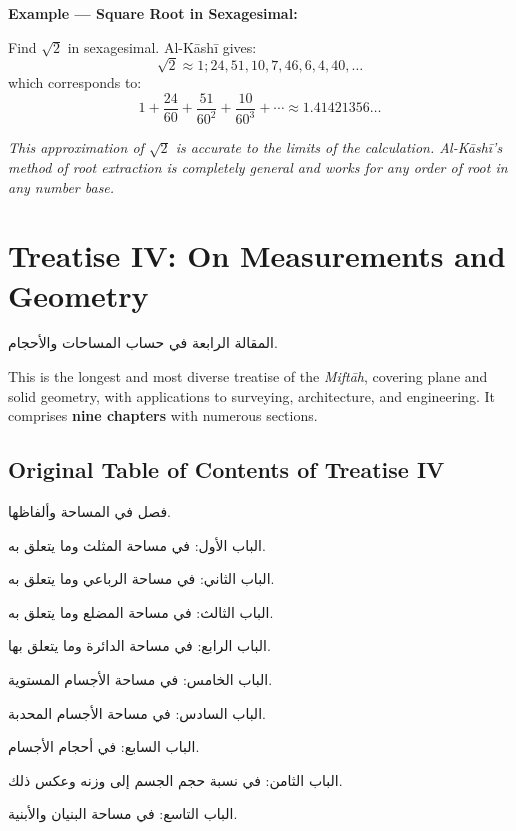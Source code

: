\documentclass[11pt,a4paper]{article}
\newenvironment{arabicbox}{%
  \begin{framed}
  \begin{minipage}{\linewidth-2\fboxsep-2\fboxrule}
  \setlength{\parindent}{0pt}
  \linespread{1.3}\selectfont
}{%
  \end{minipage}
  \end{framed}
}
\newcommand{\cnote}[1]{\textcolor{notecolor}{\textit{#1}}}
\begin{document}
\noindent\textbf{Example --- Square Root in Sexagesimal:}

Find $\sqrt{2}$ in sexagesimal. Al-K\=ash\=i gives:
\[
\sqrt{2} \approx 1; 24, 51, 10, 7, 46, 6, 4, 40, \ldots
\]
which corresponds to:
\[
1 + \frac{24}{60} + \frac{51}{60^2} + \frac{10}{60^3} + \cdots \approx
1.41421356\ldots
\]

\cnote{This approximation of $\sqrt{2}$ is accurate to the limits of
the calculation. Al-K\=ash\=i's method of root extraction is completely
general and works for any order of root in any number base.}
\clearpage

\section{Treatise IV: On Measurements and Geometry}
\label{sec:treatise4}

\begin{arabicbox}
\begin{Arabic}
المقالة الرابعة في حساب المساحات والأحجام.
\end{Arabic}
\end{arabicbox}

\vspace{0.3cm}

\noindent This is the longest and most diverse treatise of the
\textit{Mift\=ah}, covering plane and solid geometry, with applications to
surveying, architecture, and engineering. It comprises \textbf{nine
chapters} with numerous sections.

\subsection{Original Table of Contents of Treatise IV}

\begin{arabicbox}
\begin{Arabic}
فصل في المساحة وألفاظها.

الباب الأول: في مساحة المثلث وما يتعلق به.

الباب الثاني: في مساحة الرباعي وما يتعلق به.

الباب الثالث: في مساحة المضلع وما يتعلق به.

الباب الرابع: في مساحة الدائرة وما يتعلق بها.

الباب الخامس: في مساحة الأجسام المستوية.

الباب السادس: في مساحة الأجسام المحدبة.

الباب السابع: في أحجام الأجسام.

الباب الثامن: في نسبة حجم الجسم إلى وزنه وعكس ذلك.

الباب التاسع: في مساحة البنيان والأبنية.
\end{Arabic}
\end{arabicbox}
\end{document}

